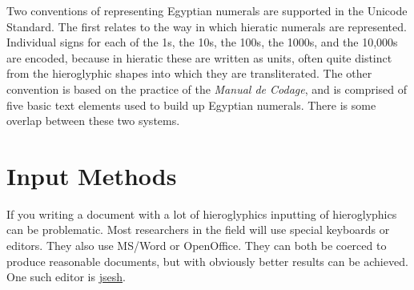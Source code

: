 Two conventions of representing Egyptian numerals are supported in the Unicode Standard.
The first relates to the way in which hieratic numerals are represented. Individual
signs for each of the 1s, the 10s, the 100s, the 1000s, and the 10,000s are encoded, because in
hieratic these are written as units, often quite distinct from the hieroglyphic shapes into
which they are transliterated. The other convention is based on the practice of the \emph{Manual
de Codage}, and is comprised of five basic text elements used to build up Egyptian numerals.
There is some overlap between these two systems.

%

\section{Input Methods}

If you writing a document with a lot of hieroglyphics inputting of hieroglyphics can be problematic. Most researchers in the field will use special keyboards or editors. They also use MS/Word or OpenOffice. They can both be coerced to produce reasonable documents, but with \tex obviously better results can be achieved. One such editor is \href{http://jsesh.qenherkhopeshef.org/}{jsesh}. 






